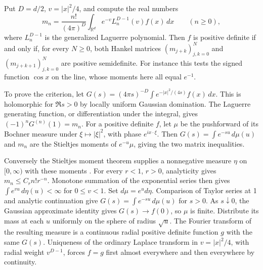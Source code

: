 \documentclass[11pt,a4paper]{article}
\numberwithin{equation}{section}
\begin{document}
Put $D=d/2$, $v=|x|^2/4$, and compute the real numbers
\[
 m_n=\frac{n!}{(4\pi)^D}\int_{\mathbb R^d}e^{-v}L_n^{D-1}(v) f(x)\,dx\qquad(n\ge0),
\]
where $L_n^{D-1}$ is the generalized Laguerre polynomial. Then $f$ is positive definite if and only if, for every $N\ge0$, both Hankel matrices $(m_{j+k})_{j,k=0}^N$ and $(m_{j+k+1})_{j,k=0}^N$ are positive semidefinite. For instance this tests the signed function $\cos x$ on the line, whose moments here all equal $e^{-1}$.

To prove the criterion, let $G(s)=(4\pi s)^{-D}\int e^{-|x|^2/(4s)}f(x)\,dx$. This is holomorphic for $\Re s>0$ by locally uniform Gaussian domination. The Laguerre generating function, or differentiation under the integral, gives $(-1)^nG^{(n)}(1)=m_n$. For a positive definite $f$, let $\mu$ be the pushforward of its Bochner measure under $\xi\mapsto |\xi|^2$, with phase $e^{ix\cdot\xi}$. Then $G(s)=\int e^{-su}\,d\mu(u)$ and $m_n$ are the Stieltjes moments of $e^{-u}\mu$, giving the two matrix inequalities.

Conversely the Stieltjes moment theorem supplies a nonnegative measure $\eta$ on $[0,\infty)$ with these moments \cite{Akhiezer}. For every $r<1$, $r>0$, analyticity gives $m_n\le C_r n!r^{-n}$. Monotone summation of the exponential series then gives $\int e^{vu}\,d\eta(u)<\infty$ for $0\le v<1$. Set $d\mu=e^u d\eta$. Comparison of Taylor series at 1 and analytic continuation give $G(s)=\int e^{-su}\,d\mu(u)$ for $s>0$. As $s\downarrow0$, the Gaussian approximate identity gives $G(s)\to f(0)$, so $\mu$ is finite. Distribute its mass at each $u$ uniformly on the sphere of radius $\sqrt u$. The Fourier transform of the resulting measure is a continuous radial positive definite function $g$ with the same $G(s)$. Uniqueness of the ordinary Laplace transform in $v=|x|^2/4$, with radial weight $v^{D-1}$, forces $f=g$ first almost everywhere and then everywhere by continuity.
\end{document}

